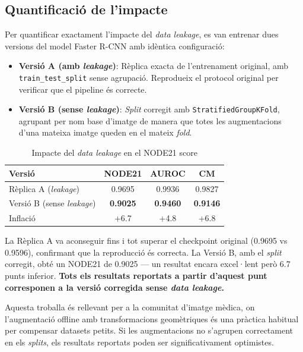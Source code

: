 \documentclass[conference]{IEEEtran}
\begin{document}
\subsection{Quantificació de l'impacte}

Per quantificar exactament l'impacte del \textit{data leakage}, es van entrenar dues versions del model Faster R-CNN amb idèntica configuració:

\begin{itemize}
    \item \textbf{Versió A (amb \textit{leakage})}: Rèplica exacta de l'entrenament original, amb \texttt{train\_test\_split} sense agrupació. Reprodueix el protocol original per verificar que el pipeline és correcte.
    \item \textbf{Versió B (sense \textit{leakage})}: \textit{Split} corregit amb \texttt{StratifiedGroupKFold}, agrupant per nom base d'imatge de manera que totes les augmentacions d'una mateixa imatge queden en el mateix \textit{fold}.
\end{itemize}

\begin{table}[t]
\centering
\caption{Impacte del \textit{data leakage} en el NODE21 score}
\label{tab:leakage}
\small
\setlength{\tabcolsep}{4pt}
\begin{tabular}{lccc}
\toprule
Versió & NODE21 & AUROC & CM \\
\midrule
Rèplica A (\textit{leakage}) & 0.9695 & 0.9936 & 0.9827 \\
Versió B (sense \textit{leakage}) & \textbf{0.9025} & \textbf{0.9460} & \textbf{0.9146} \\
\midrule
Inflació & +6.7 & +4.8 & +6.8 \\
\bottomrule
\end{tabular}
\end{table}

La Rèplica A va aconseguir fins i tot superar el checkpoint original (0.9695 vs 0.9596), confirmant que la reproducció és correcta. La Versió B, amb el \textit{split} corregit, obté un NODE21 de 0.9025 --- un resultat encara excel·lent però 6.7 punts inferior. \textbf{Tots els resultats reportats a partir d'aquest punt corresponen a la versió corregida sense \textit{data leakage}.}

Aquesta troballa és rellevant per a la comunitat d'imatge mèdica, on l'augmentació offline amb transformacions geomètriques és una pràctica habitual per compensar datasets petits. Si les augmentacions no s'agrupen correctament en els \textit{splits}, els resultats reportats poden ser significativament optimistes.
\end{document}
